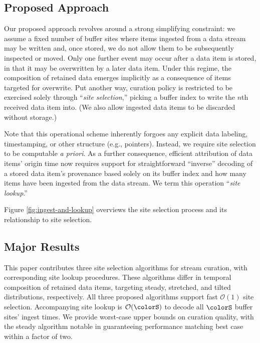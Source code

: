 \subsection{Proposed Approach}


Our proposed approach revolves around a strong simplifying constraint: we assume a fixed number of buffer sites where items ingested from a data stream may be written and, once stored, we do not allow them to be subsequently inspected or moved.
Only one further event may occur after a data item is stored, in that it may be overwritten by a later data item.
Under this regime, the composition of retained data emerges implicitly as a consequence of items targeted for overwrite.
Put another way, curation policy is restricted to be exercised solely through ``\textit{site selection},'' picking a buffer index to write the $n$th received data item into.
(We also allow ingested data items to be discarded without storage.)

Note that this operational scheme inherently forgoes any explicit data labeling, timestamping, or other structure (e.g., pointers).
Instead, we require site selection to be computable \textit{a priori}.
As a further consequence, efficient attribution of data items' origin time now requires support for straightforward ``inverse'' decoding of a stored data item's provenance based solely on its buffer index and how many items have been ingested from the data stream.
We term this operation ``\textit{site lookup}.''



Figure \ref{fig:ingest-and-lookup} overviews the site selection process and its relationship to site selection.

\subsection{Major Results}

This paper contributes three site selection algorithms for stream curation, with corresponding site lookup procedures.
These algorithms differ in temporal composition of retained data items, targeting steady, stretched, and tilted distributions, respectively.
All three proposed algorithms support fast $\mathcal{O}(1)$ site selection.
Accompanying site lookup is $\mathcal{O}(\colorS)$ to decode all $\colorS$ buffer sites' ingest times.
We provide worst-case upper bounds on curation quality, with the steady algorithm notable in guaranteeing performance matching best case within a factor of two.
